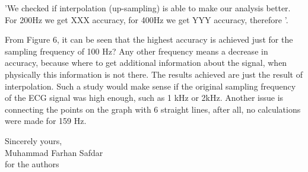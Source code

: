 \documentclass{article}
\begin{document}
'We checked if interpolation (up-sampling) is able to make our analysis better. For 200Hz we get XXX accuracy, for 400Hz we get YYY accuracy,
therefore '.

From Figure 6, it can be seen that the highest accuracy is achieved just for the sampling frequency of 100 Hz? Any other frequency means a decrease in accuracy, because where to get additional information about the signal, when physically this information is not there. The results achieved are just the result of interpolation. Such a study would make sense if the original sampling frequency of the ECG signal was high enough, such as 1 kHz or 2kHz. Another issue is connecting the points on the graph with 6 straight lines, after all, no calculations were made for 159 Hz.


\vspace{0.25in}

Sincerely yours,\\
Muhammad Farhan Safdar\\
for the authors
\end{document}

